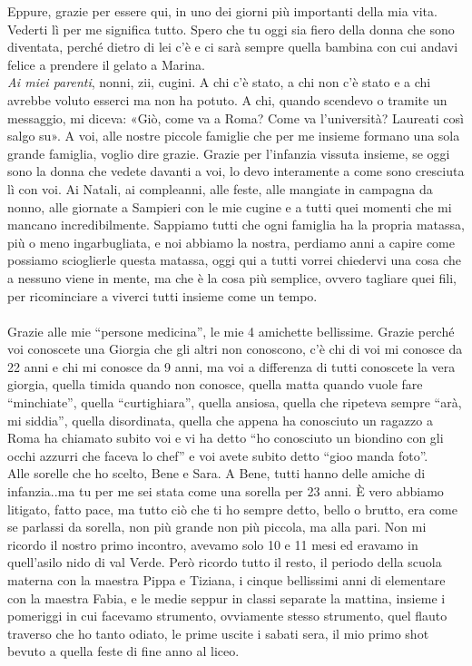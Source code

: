Eppure, grazie per essere qui, in uno dei giorni più importanti della mia vita. Vederti lì per me significa tutto. Spero che tu oggi sia fiero della donna che sono diventata, perché dietro di lei c'è e ci sarà sempre quella bambina con cui andavi felice a prendere il gelato a Marina.
\\
\textit{Ai miei parenti}, nonni, zii, cugini. A chi c’è stato, a chi non c’è stato e a chi avrebbe voluto esserci ma non ha potuto. A chi, quando scendevo o tramite un messaggio, mi diceva: «Giò, come va a Roma? Come va l’università? Laureati così salgo su». A voi, alle nostre piccole famiglie che per me insieme formano una sola grande famiglia, voglio dire grazie. Grazie per l’infanzia vissuta insieme, se oggi sono la donna che vedete davanti a voi, lo devo interamente a come sono cresciuta lì con voi. Ai Natali, ai compleanni, alle feste, alle mangiate in campagna da nonno, alle giornate a Sampieri con le mie cugine e a tutti quei momenti che mi mancano incredibilmente. 
Sappiamo tutti che  ogni famiglia ha la propria matassa, più o meno ingarbugliata, e noi abbiamo la nostra, perdiamo anni a capire come possiamo scioglierle questa matassa, oggi qui a tutti vorrei chiedervi una cosa che a nessuno viene in mente, ma che è la cosa più semplice, ovvero tagliare quei fili, per ricominciare a viverci tutti insieme come un tempo.
\\\\
Grazie alle mie “persone medicina”, le mie 4 amichette bellissime. Grazie perché voi conoscete una Giorgia che gli altri non conoscono, c’è chi di voi mi conosce da 22 anni e chi mi conosce da 9 anni, ma voi a differenza di tutti conoscete la vera giorgia, quella timida quando non conosce, quella matta quando vuole fare “minchiate”, quella “curtighiara”, quella ansiosa, quella che ripeteva sempre “arà, mi siddia”, quella disordinata, quella che appena ha conosciuto un ragazzo a Roma ha chiamato subito voi e vi ha detto “ho conosciuto un biondino con gli occhi azzurri che faceva lo chef” e voi avete subito detto “gioo manda foto”.
\\
Alle sorelle che ho scelto, Bene e Sara.
A Bene, tutti hanno delle amiche di infanzia..ma tu per me sei stata come una sorella per 23 anni. È vero abbiamo litigato, fatto pace, ma tutto ciò che ti ho sempre detto, bello o brutto, era come se parlassi da sorella, non più grande non più piccola, ma alla pari. Non mi ricordo il nostro primo incontro, avevamo solo 10 e 11 mesi ed eravamo in quell’asilo nido di val Verde. Però ricordo tutto il resto, il periodo della scuola materna con la maestra Pippa e Tiziana, i cinque bellissimi anni di elementare con la maestra Fabia, e le medie seppur in classi separate la mattina, insieme i pomeriggi in cui facevamo strumento, ovviamente stesso strumento, quel flauto traverso che ho tanto odiato, le prime uscite i sabati sera, il mio primo shot bevuto a quella feste di fine anno al liceo.
